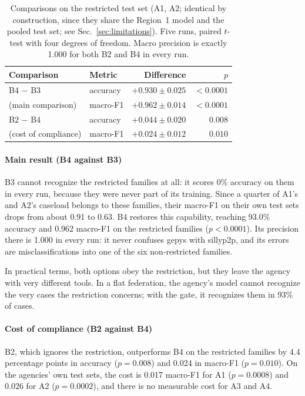 \begin{table}[t]
\centering
\scriptsize
\caption{Comparisons on the restricted test set (A1, A2; identical
by construction, since they share the Region~1 model and the pooled test
set; see Sec.~\ref{sec:limitations}). Five runs, paired $t$-test with four
degrees of freedom. Macro precision is exactly 1.000 for both B2 and B4 in
every run.}
\label{tab:headline}
\begin{tabular}{llrr}
\toprule
Comparison & Metric & Difference & $p$ \\
\midrule
B4 $-$ B3 & accuracy   & $+0.930 \pm 0.025$  & $<0.0001$ \\
(main comparison) & macro-F1   & $+0.962 \pm 0.014$  & $<0.0001$ \\
                  
\midrule
B2 $-$ B4 & accuracy   & $+0.044 \pm 0.020$  & $0.008$ \\
(cost of compliance) & macro-F1 & $+0.024 \pm 0.012$  & $0.010$ \\
                 
\bottomrule
\end{tabular}
\end{table}


\paragraph{Main result (B4 against B3)}
B3 cannot recognize the restricted families at all: it scores 0\% accuracy on them in every run, because they were never part of its training. Since a quarter of A1's and A2's caseload belongs to these families, their macro-F1 on their own test sets drops from about 0.91 to 0.63. B4 restores this capability, reaching 93.0\% accuracy and 0.962 macro-F1 on the restricted families ($p<0.0001$). Its precision there is 1.000 in every run: it never confuses gepys with sillyp2p, and its errors are misclassifications into one of the six non-restricted families.

In practical terms, both options obey the restriction, but they leave the agency with very different tools. In a flat federation, the agency's model cannot recognize the very cases the restriction concerns; with the gate, it recognizes them in 93\% of cases.


\paragraph{Cost of compliance (B2 against B4)}
B2, which ignores the restriction, outperforms B4 on the restricted families by 4.4 percentage points in accuracy ($p=0.008$) and 0.024 in macro-F1 ($p=0.010$). On the agencies' own test sets, the cost is 0.017 macro-F1 for A1 ($p=0.0008$) and 0.026 for A2 ($p=0.0002$), and there is no measurable cost for A3 and A4.

